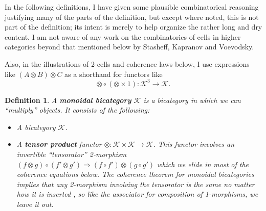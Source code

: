 \documentclass[12pt,twoside,openright]{report}
\newtheorem{defn}{Definition}
\newcommand{\tensor}{\otimes}
\newcommand{\C}{ {\mathcal{K}}  }
\begin{document}
In the following definitions, I have given some plausible combinatorical reasoning justifying many of the parts of the definition, but except where noted, this is not part of the definition; its intent is merely to help organize the rather long and dry content.  I am not aware of any work on the combinatorics of cells in higher categories beyond that mentioned below by Stasheff, Kapranov and Voevodsky.  

Also, in the illustrations of 2-cells and coherence laws below, I use expressions like $(A \tensor B) \tensor C$ as a shorthand for functors like
      \[\tensor \circ (\tensor \times 1): \C^3 \to \C.\]

\begin{defn} A {\bf monoidal bicategory} $\C$ is a bicategory in which we can ``multiply'' objects.  It consists of the following: \\
  
\begin{itemize}
\item A bicategory $\C$.
\item A {\bf tensor product} functor $\otimes:\C \times \C \rightarrow
\C$.  This functor involves an invertible ``tensorator'' 2-morphism
$(f \otimes g) \circ (f' \otimes g') \Rightarrow 
(f \circ f') \otimes (g \circ g')$ which we elide in most of the coherence equations below.  The coherence theorem for monoidal bicategories implies that any 2-morphism involving the tensorator is the same no matter how it is inserted \cite[Remark~3.1.6]{Gurski}, so like the associator for composition of 1-morphisms, we leave it out.


\end{itemize}
\end{defn}
\end{document}
